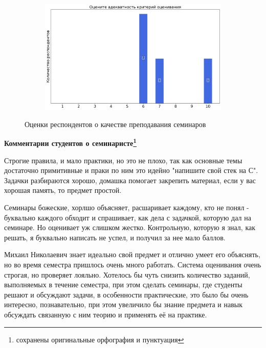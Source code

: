 \begin{figure}[H]
\begin{subfigure}[b]{0.45\textwidth}
			\end{subfigure}
			\begin{subfigure}[b]{0.45\textwidth}
				\centering
				\includegraphics[width=\textwidth]{images/3 course/Вычислительная математика/seminarists-marks-Петров М.Н.-3.png}
			\end{subfigure}	
			\caption{Оценки респондентов о качестве преподавания семинаров}
		\end{figure}

		\textbf{Комментарии студентов о семинаристе\protect\footnote{сохранены оригинальные орфография и пунктуация}}
            \begin{commentbox} 
                Строгие правила, и мало практики, но это не плохо, так как основные темы достаточно примитивные и праки по ним это идейно "напишите свой стек на С". Задачки разбираются хорошо, домашка помогает закрепить материал, если у вас хорошая память, то предмет простой.
            \end{commentbox} 
        
            \begin{commentbox} 
                Семинары божеские, хорлшо объясняет, расшаривает каждому, кто не понял - буквально каждого обходит и спрашивает, как дела с задачкой, которую дал на семинаре. Но оценивает уж слишком жестко. Контрольную, которую я знал, как решать, я буквально написать не успел, и получил за нее мало баллов. 
            \end{commentbox} 
        
            \begin{commentbox} 
                Михаил Николаевич знает идеально свой предмет и отлично умеет его объяснять, но во время семестра пришлось очень много работать. Система оценивания очень строгая, но проверяет лояльно. Хотелось бы чуть снизить количество заданий, выполняемых в течение семестра, при этом сделать семинары, где студенты решают и обсуждают задачи, в особенности практические, это было бы очень интересно, познавательно, при этом увеличило бы знание предмета и навык обсуждать связанную с ним теорию и применять её на практике. 
            \end{commentbox} 
        
